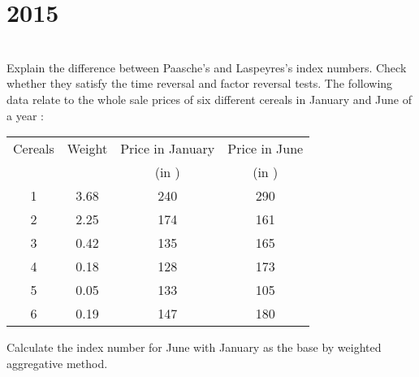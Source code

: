 \section*{2015}
\vspace{-.5cm}
\hrulefill \smallskip\\
 Explain the difference between Paasche's and Laspeyres's index numbers. Check whether they satisfy the time reversal and factor reversal tests.
\myline
{} The following data relate to the whole sale prices of six different cereals in January and June of a year :
\begin{center}
    \begin{tabular}{| c | c | c| c |} \hline
    Cereals & Weight & Price in January & Price in June \vspace{-1.5ex}\\ 
     &   & (in ) & (in ) \\ \hline
     1 & 3.68 & 240 & 290  \\
     2 & 2.25 & 174 & 161    \\
     3 & 0.42 & 135 & 165    \\
     4 & 0.18 & 128 & 173    \\
     5 & 0.05 & 133 & 105    \\
     6 & 0.19 & 147 & 180    \\ \hline
    \end{tabular}
\end{center} Calculate the index number for June with January as the base by weighted aggregative method.
